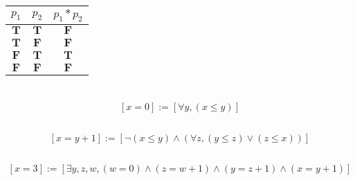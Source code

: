 \documentclass[UTF-8]{ctexart}
\begin{document}
\begin{center}
\begin{tabular}{c|c|c}
	$p_1$ & $p_2$ & $p_1 * p_2$\\
	\hline
	$\mathbf T$ & $\mathbf T$ & $\mathbf F$\\
	\hline
	$\mathbf T$ & $\mathbf F$ & $\mathbf F$\\
\hline
	$\mathbf F$ & $\mathbf T$ & $\mathbf T$\\
\hline
	$\mathbf F$ & $\mathbf F$ & $\mathbf F$\\

\end{tabular}
\end{center}

\section{}

\subsection{}
$$[x = 0] := [\forall y, (x \le y)]$$
\subsection{}
$$[x = y + 1] := [\lnot (x \le y) \wedge (\forall z, (y \le z) \vee (z \le x))]$$
\subsection{}
$$[x = 3] := [\exists y, z, w, (w = 0) \wedge (z = w + 1) \wedge (y = z + 1) \wedge (x = y + 1)]$$
\end{document}
